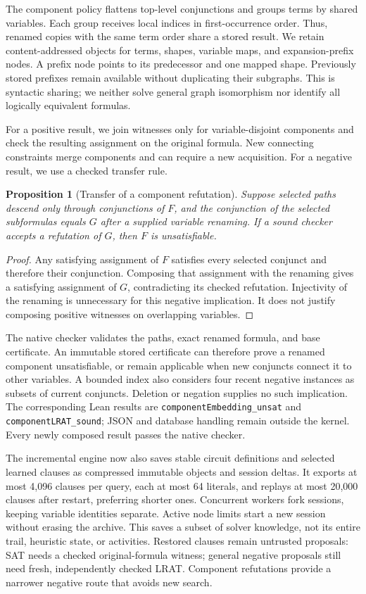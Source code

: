 \documentclass[11pt,a4paper]{article}
\numberwithin{equation}{section}
\theoremstyle{plain}
\newtheorem{proposition}[lemma]{Proposition}
\theoremstyle{definition}
\theoremstyle{remark}
\begin{document}
The component policy flattens top-level conjunctions and groups terms by shared variables. Each group receives local indices in first-occurrence order. Thus, renamed copies with the same term order share a stored result. We retain content-addressed objects for terms, shapes, variable maps, and expansion-prefix nodes. A prefix node points to its predecessor and one mapped shape. Previously stored prefixes remain available without duplicating their subgraphs. This is syntactic sharing; we neither solve general graph isomorphism nor identify all logically equivalent formulas.

For a positive result, we join witnesses only for variable-disjoint components and check the resulting assignment on the original formula. New connecting constraints merge components and can require a new acquisition. For a negative result, we use a checked transfer rule.

\begin{proposition}[Transfer of a component refutation]
\label{prop:component-refutation}
Suppose selected paths descend only through conjunctions of $F$, and the conjunction of the selected subformulas equals $G$ after a supplied variable renaming. If a sound checker accepts a refutation of $G$, then $F$ is unsatisfiable.
\end{proposition}

\begin{proof}
Any satisfying assignment of $F$ satisfies every selected conjunct and therefore their conjunction. Composing that assignment with the renaming gives a satisfying assignment of $G$, contradicting its checked refutation. Injectivity of the renaming is unnecessary for this negative implication. It does not justify composing positive witnesses on overlapping variables.
\end{proof}

The native checker validates the paths, exact renamed formula, and base certificate. An immutable stored certificate can therefore prove a renamed component unsatisfiable, or remain applicable when new conjuncts connect it to other variables. A bounded index also considers four recent negative instances as subsets of current conjuncts. Deletion or negation supplies no such implication. The corresponding Lean results are \texttt{componentEmbedding\_unsat} and \texttt{componentLRAT\_sound}; JSON and database handling remain outside the kernel. Every newly composed result passes the native checker.

The incremental engine now also saves stable circuit definitions and selected learned clauses as compressed immutable objects and session deltas. It exports at most 4,096 clauses per query, each at most 64 literals, and replays at most 20,000 clauses after restart, preferring shorter ones. Concurrent workers fork sessions, keeping variable identities separate. Active node limits start a new session without erasing the archive. This saves a subset of solver knowledge, not its entire trail, heuristic state, or activities. Restored clauses remain untrusted proposals: SAT needs a checked original-formula witness; general negative proposals still need fresh, independently checked LRAT. Component refutations provide a narrower negative route that avoids new search.
\end{document}
